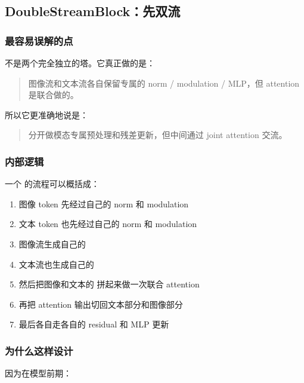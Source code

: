 \subsection{DoubleStreamBlock：先双流}

\subsubsection{最容易误解的点}

 不是两个完全独立的塔。它真正做的是：

\begin{quote}
图像流和文本流各自保留专属的 norm / modulation / MLP，但 attention 是联合做的。
\end{quote}

所以它更准确地说是：

\begin{quote}
分开做模态专属预处理和残差更新，但中间通过 joint attention 交流。
\end{quote}

\subsubsection{内部逻辑}

一个  的流程可以概括成：

\begin{enumerate}[leftmargin=1.5em]
  \item 图像 token 先经过自己的 norm 和 modulation
  \item 文本 token 也先经过自己的 norm 和 modulation
  \item 图像流生成自己的 
  \item 文本流也生成自己的 
  \item 然后把图像和文本的  拼起来做一次联合 attention
  \item 再把 attention 输出切回文本部分和图像部分
  \item 最后各自走各自的 residual 和 MLP 更新
\end{enumerate}

\subsubsection{为什么这样设计}

因为在模型前期：

